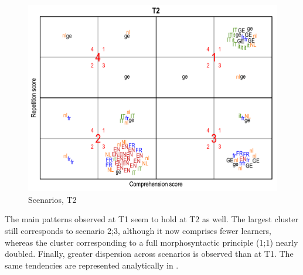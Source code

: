 \begin{figure}
    \includegraphics[width=\textwidth]{figures/06-6.pdf}
    \caption{Scenarios, T2}
    \label{fig:06:6}
\end{figure}

The main patterns observed at T1 seem to hold at T2 as well. The largest cluster still corresponds to scenario 2;3, although it now comprises fewer learners, whereas the cluster corresponding to a full morphosyntactic principle (1;1) nearly doubled. Finally, greater dispersion across scenarios is observed than at T1. The same tendencies are represented analytically in .

\begin{table}
    \caption{Implicational hierarchy at T2}
    \label{tab:06:5}
\end{table}

